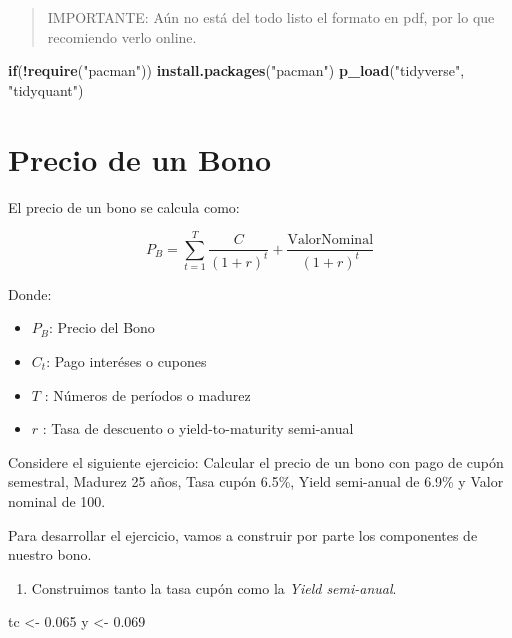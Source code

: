 \documentclass[12pt,]{book}
\newenvironment{Shaded}{\begin{snugshade}}{\end{snugshade}}
\newcommand{\KeywordTok}[1]{\textcolor[rgb]{0.13,0.29,0.53}{\textbf{#1}}}
\newcommand{\FloatTok}[1]{\textcolor[rgb]{0.00,0.00,0.81}{#1}}
\newcommand{\StringTok}[1]{\textcolor[rgb]{0.31,0.60,0.02}{#1}}
\newcommand{\ControlFlowTok}[1]{\textcolor[rgb]{0.13,0.29,0.53}{\textbf{#1}}}
\newcommand{\OperatorTok}[1]{\textcolor[rgb]{0.81,0.36,0.00}{\textbf{#1}}}
\newcommand{\NormalTok}[1]{#1}
\providecommand{\tightlist}{%
  \setlength{\itemsep}{0pt}\setlength{\parskip}{0pt}}
\begin{document}
\begin{quote}
IMPORTANTE: Aún no está del todo listo el formato en pdf, por lo que
recomiendo verlo online.
\end{quote}

\begin{Shaded}
\begin{Highlighting}[]
\ControlFlowTok{if}\NormalTok{(}\OperatorTok{!}\KeywordTok{require}\NormalTok{(}\StringTok{"pacman"}\NormalTok{)) }\KeywordTok{install.packages}\NormalTok{(}\StringTok{"pacman"}\NormalTok{)}
\KeywordTok{p_load}\NormalTok{(}\StringTok{"tidyverse"}\NormalTok{, }\StringTok{"tidyquant"}\NormalTok{)}
\end{Highlighting}
\end{Shaded}

\section{Precio de un Bono}\label{precio-de-un-bono}

El precio de un bono se calcula como:

\[
P_{B} = \sum_{t=1}^{T} \frac{C}{(1+r)^t} + \frac{\text{ValorNominal}}{(1+r)^t}
\]

Donde:

\begin{itemize}
\tightlist
\item
  \(P_B\): Precio del Bono
\item
  \(C_t\): Pago interéses o cupones
\item
  \(T\) : Números de períodos o madurez
\item
  \(r\) : Tasa de descuento o yield-to-maturity semi-anual
\end{itemize}

Considere el siguiente ejercicio: Calcular el precio de un bono con pago
de cupón semestral, Madurez 25 años, Tasa cupón 6.5\%, Yield semi-anual
de 6.9\% y Valor nominal de 100.

Para desarrollar el ejercicio, vamos a construir por parte los
componentes de nuestro bono.

\begin{enumerate}
\def\labelenumi{\arabic{enumi}.}
\tightlist
\item
  Construimos tanto la tasa cupón como la \emph{Yield semi-anual}.
\end{enumerate}

\begin{Shaded}
\begin{Highlighting}[]
\NormalTok{tc <-}\StringTok{ }\FloatTok{0.065}
\NormalTok{y  <-}\StringTok{ }\FloatTok{0.069}
\end{Highlighting}
\end{Shaded}
\end{document}
